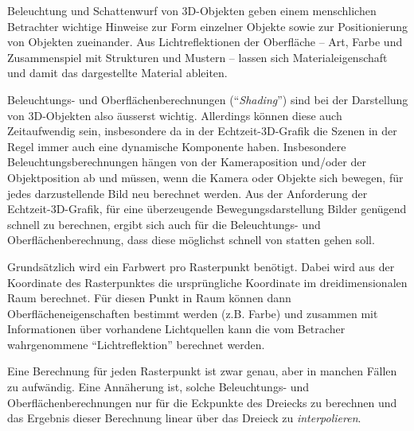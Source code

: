 \documentclass[twoside,a4paper,fleqn,12pt]{book}
\begin{document}
Beleuchtung und Schattenwurf von 3D-Objekten geben einem menschlichen Betrachter wichtige Hinweise zur Form
einzelner Objekte sowie zur Positionierung von Objekten zueinander. Aus Lichtreflektionen der Oberfläche -- Art, Farbe und Zusammenspiel
mit Strukturen und Mustern -- lassen sich Materialeigenschaft und damit das dargestellte Material ableiten.

Beleuchtungs- und Oberflächenberechnungen (``\emph{Shading}'') sind bei der Darstellung von 3D-Objekten also äusserst wichtig.
Allerdings können diese auch Zeitaufwendig sein, insbesondere da in der Echtzeit-3D-Grafik die Szenen in der Regel
immer auch eine dynamische Komponente haben. Insbesondere Beleuchtungsberechnungen hängen von der Kameraposition
und/oder der Objektposition ab und müssen, wenn die Kamera oder Objekte sich bewegen, für jedes darzustellende Bild
neu berechnet werden. Aus der Anforderung der Echtzeit-3D-Grafik, für eine überzeugende Bewegungsdarstellung
Bilder genügend schnell zu berechnen, ergibt sich auch für die Beleuchtungs- und Oberflächenberechnung, dass diese
möglichst schnell von statten gehen soll.

Grundsätzlich wird ein Farbwert pro Rasterpunkt benötigt. Dabei wird aus der Koordinate des Rasterpunktes die ursprüngliche Koordinate
im dreidimensionalen Raum berechnet. Für diesen Punkt in Raum können dann Oberflächeneigenschaften bestimmt werden
(z.B. Farbe) und zusammen mit Informationen über vorhandene Lichtquellen kann die vom Betracher wahrgenommene 
"`Lichtreflektion"' berechnet werden.

Eine Berechnung für jeden Rasterpunkt ist zwar genau, aber in manchen Fällen zu aufwändig. Eine Annäherung ist,
solche Beleuchtungs- und Oberflächenberechnungen nur für die Eckpunkte des Dreiecks zu berechnen und das Ergebnis
dieser Berechnung linear über das Dreieck zu \emph{interpolieren}.
\end{document}
